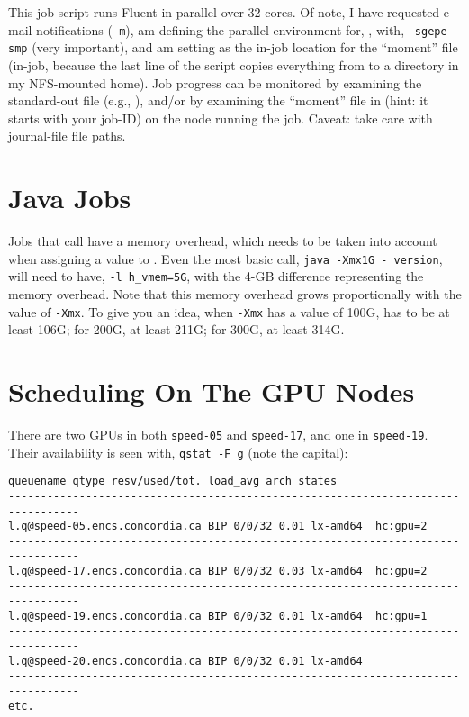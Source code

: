 \documentclass{easychair}
\begin{document}
This job script runs Fluent in parallel over 32 cores. Of note, I have requested e-mail notifications (\texttt{-m}), am defining the parallel environment for, , with, \texttt{-sgepe  smp} (very important), and am setting  as the in-job location for the ``moment''  file (in-job, because the last line of the script copies everything from  to a directory in my NFS-mounted home). Job progress can be monitored by examining the standard-out file (e.g., ), and/or by examining the ``moment'' file in  (hint: it starts with your job-ID) on the node running the job. Caveat: take care with journal-file file paths.  

\section{Java Jobs}

Jobs that call  have a memory overhead, which needs to be taken into account when assigning a value to . Even the most basic  call, \texttt{java -Xmx1G - version}, will need to have, \texttt{-l h\_vmem=5G}, with the 4-GB difference representing the memory overhead. Note that this memory overhead grows proportionally with the value of \texttt{-Xmx}. To give you an idea, when \texttt{-Xmx} has a value of 100G,  has to be at least 106G; for 200G, at least 211G; for 300G, at least 314G. 

\section{Scheduling On The GPU Nodes}

There are two GPUs in both \texttt{speed-05} and \texttt{speed-17}, and one in \texttt{speed-19}. Their availability is seen with, \texttt{qstat -F g} (note the capital): 

\small
\begin{verbatim}
queuename qtype resv/used/tot. load_avg arch states
---------------------------------------------------------------------------------
l.q@speed-05.encs.concordia.ca BIP 0/0/32 0.01 lx-amd64  hc:gpu=2 
--------------------------------------------------------------------------------- 
l.q@speed-17.encs.concordia.ca BIP 0/0/32 0.03 lx-amd64  hc:gpu=2 
--------------------------------------------------------------------------------- 
l.q@speed-19.encs.concordia.ca BIP 0/0/32 0.01 lx-amd64  hc:gpu=1 
--------------------------------------------------------------------------------- 
l.q@speed-20.encs.concordia.ca BIP 0/0/32 0.01 lx-amd64
--------------------------------------------------------------------------------- 
etc. 
\end{verbatim}
\normalsize
\end{document}
